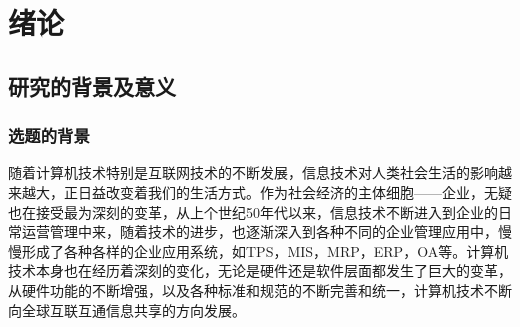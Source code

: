 
\chapter{\texorpdfstring{绪\thesistitlespace 论}{绪论}}\label{chap:1}

\vspace{19.44bp}
\vspace{19.5bp}

\section{研究的背景及意义}


\subsection{选题的背景}


\ifecjtuguide\vspace{0.08bp}\fi
随着计算机技术特别是互联网技术的不断发展，信息技术对人类社会生活的影响越来越大，正日益改变着我们的生活方式。作为社会经济的主体细胞——企业，无疑也在接受最为深刻的变革，从上个世纪\hspace{5.904bp}50\hspace{5.88bp}年代以来，信息技术不断进入到企业的日常运营管理中来，随着技术的进步，也逐渐深入到各种不同的企业管理应用中，慢慢形成了各种各样的企业应用系统，如TPS，MIS，MRP，ERP，\hspace{6bp}OA等。计算机技术本身也在经历着深刻的\linebreak 变化，无论是硬件还是软件层面都发生了巨大的变革，从硬件功能的不断增强，以及各种\linebreak 标准和规范的不断完善和统一，计算机技术不断向全球互联互通信息共享的方向发展。


